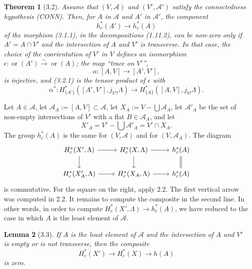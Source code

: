 \documentclass[11pt]{article}
\newtheorem{theorem}{Theorem}[section]
\newtheorem{lemma}[theorem]{Lemma}
\theoremstyle{definition}
\newcommand{\ornt}{\operatorname{or}}
\begin{document}
\begin{theorem}[3.2]
Assume that $(V,\mathcal A)$ and $(V',\mathcal A')$ satisfy the connectedness hypothesis \textup{(CONN)}.  Then, for $A$ in $\mathcal A$ and $A'$ in $\mathcal A'$, the component
\begin{equation}
h_c^*(A')\longrightarrow h_c^*(A)\tag{3.2.1}
\end{equation}
of the morphism (3.1.1), in the decompositions (1.11.2), can be non-zero only if $A'=A\cap V'$ and the intersection of $A$ and $V'$ is transverse.  In that case, the choice of the coorientation of $V'$ in $V$ defines an isomorphism $\epsilon:\ornt(A')\xrightarrow{\sim}\ornt(A)$; the map ``trace on $V'$'',
\[
\alpha:[A,V]\longrightarrow[A',V'],
\]
is injective, and (3.2.1) is the tensor product of $\epsilon$ with
\begin{equation}
\alpha^*:H^*_{\{A'\}}([A',V'],j_{V'!}\Lambda)\longrightarrow H^*_{\{A\}}([A,V],j_{V!}\Lambda).\tag{3.2.2}
\end{equation}
\end{theorem}

Let $A\in\mathcal A$, let $\mathcal A_A:=[A,V]\subset\mathcal A$, let $X_A:=V-\bigcup\mathcal A_A$, let $\mathcal A'_A$ be the set of non-empty intersections of $V'$ with a flat $B\in\mathcal A_A$, and let
\[
X'_A=V'-\bigcup\mathcal A'_A=V'\cap X_A.
\]
The group $h_c^*(A)$ is the same for $(V,\mathcal A)$ and for $(V,\mathcal A_A)$.  The diagram
\[
\begin{tikzcd}
H_c^*(X',\Lambda) \arrow[r] \arrow[d] & H_c^*(X,\Lambda) \arrow[r] \arrow[d] & h_c^*(A) \arrow[d,equal]\\
H_c^*(X'_A,\Lambda) \arrow[r] & H_c^*(X_A,\Lambda) \arrow[r] & h_c^*(A)
\end{tikzcd}
\]
is commutative.  For the square on the right, apply 2.2.  The first vertical arrow was computed in 2.2.  It remains to compute the composite in the second line.  In other words, in order to compute $H_c^*(X',\Lambda)\to h_c^*(A)$, we have reduced to the case in which $A$ is the least element of $\mathcal A$.

\begin{lemma}[3.3]
If $A$ is the least element of $\mathcal A$ and the intersection of $A$ and $V'$ is empty or is not transverse, then the composite
\[
H_c^*(X')\longrightarrow H_c^*(X)\longrightarrow h(A)
\]
is zero.
\end{lemma}
\end{document}

